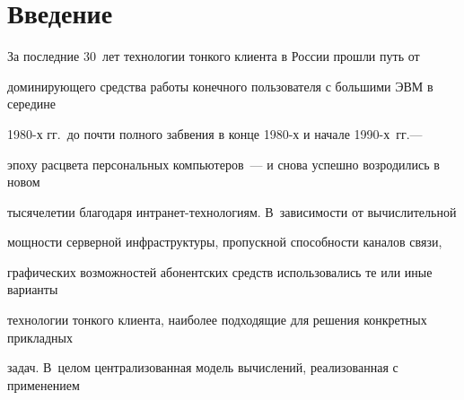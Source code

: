 




\vspace*{6pt}













      \thispagestyle{headings}





      


            \label{st\stat}


            


            \vspace*{-12pt}





\section{Введение}





       За последние 30~лет технологии тонкого клиента в России прошли путь от 


доминирующего средства работы конечного пользователя с большими ЭВМ в середине 


1980-х гг.\ до почти полного забвения в конце 1980-х и начале 1990-х~гг.--- 


эпоху расцвета персональных компьютеров~--- и снова успешно возродились в новом 


тысячелетии благодаря интра\-нет-тех\-но\-ло\-ги\-ям. В~зависимости от вычислительной 


мощности серверной инфраструктуры, пропускной способности каналов связи, 


графических возможностей абонентских средств использовались те или иные варианты 


технологии тонкого клиента, наиболее подходящие для решения конкретных прикладных 


задач. В~целом централизованная модель вычислений, реализованная с применением 


